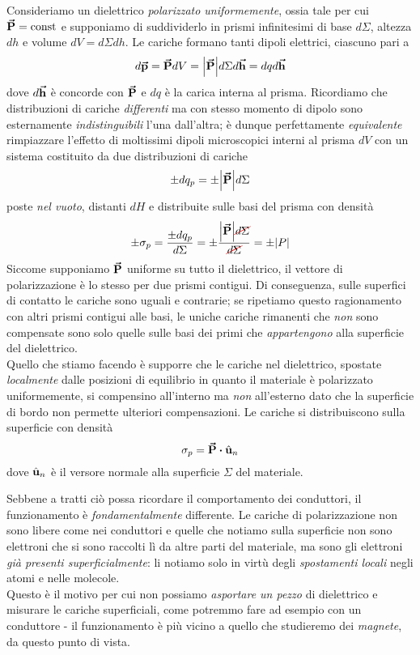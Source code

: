Consideriamo un dielettrico \textit{polarizzato uniformemente}, ossia tale per cui $\vb*{\va{P}}=\text{const}$ e supponiamo di suddividerlo in prismi infinitesimi di base $d\Sigma$, altezza $dh$ e volume $dV=d\Sigma dh$. Le cariche formano tanti dipoli elettrici, ciascuno pari a
\begin{equation*}
	d\vb*{\va{p}}=\vb*{\va{P}}dV=\abs{\vb*{\va{P}}}d\Sigma d\vb*{\va{h}}=dqd\vb*{\va{h}}
\end{equation*}
dove $d\vb*{\va{h}}$ è concorde con $\vb*{\va{P}}$ e $dq$ è la carica interna al prisma. Ricordiamo che distribuzioni di cariche \textit{differenti} ma con stesso momento di dipolo sono esternamente \textit{indistinguibili} l'una dall'altra; è dunque perfettamente \textit{equivalente} rimpiazzare l'effetto di moltissimi dipoli microscopici interni al prisma $dV$ con un sistema costituito da due distribuzioni di cariche
\begin{equation*}
	\pm dq_p=\pm \abs{\vb*{\va{P}}}d\Sigma
\end{equation*}
poste \textit{nel vuoto}, distanti $dH$ e distribuite sulle basi del prisma con densità
\begin{equation*}
	\pm\sigma_p=\frac{\pm dq_p}{d\Sigma}=\pm\frac{\abs{\vba{P}}\Ccancel[red]{d\Sigma}}{\Ccancel[red]{d\Sigma}}=\pm\abs{P}
\end{equation*}
Siccome supponiamo $\vb*{\va{P}}$ uniforme su tutto il dielettrico, il vettore di polarizzazione è lo stesso per due prismi contigui. Di conseguenza, sulle superfici di contatto le cariche sono uguali e contrarie; se ripetiamo questo ragionamento con altri prismi contigui alle basi, le uniche cariche rimanenti che \textit{non} sono compensate sono solo quelle sulle basi dei primi che \textit{appartengono} alla superficie del dielettrico.\\
Quello che stiamo facendo è supporre che le cariche nel dielettrico, spostate \textit{localmente} dalle posizioni di equilibrio in quanto il materiale è polarizzato uniformemente, si compensino all'interno ma \textit{non} all'esterno dato che la superficie di bordo non permette ulteriori compensazioni. Le cariche si distribuiscono sulla superficie con densità
\begin{equation}
	\sigma_p=\vba{P}\vdot \vbh{u}_n
\end{equation}
dove $\hat{\mathbf{u}}_n$ è il versore normale alla superficie $\Sigma$ del materiale.
\begin{attention}
	Sebbene a tratti ciò possa ricordare il comportamento dei conduttori, il funzionamento è \textit{fondamentalmente} differente. Le cariche di polarizzazione non sono libere come nei conduttori e quelle che notiamo sulla superficie non sono elettroni che si sono raccolti lì da altre parti del materiale, ma sono gli elettroni \textit{già presenti superficialmente}: li notiamo solo in virtù degli \textit{spostamenti locali} negli atomi e nelle molecole.\\
	Questo è il motivo per cui non possiamo \textit{asportare un pezzo} di dielettrico e misurare le cariche superficiali, come potremmo fare ad esempio con un conduttore - il funzionamento è più vicino a quello che studieremo dei \textit{magnete}, da questo punto di vista.
\end{attention}
